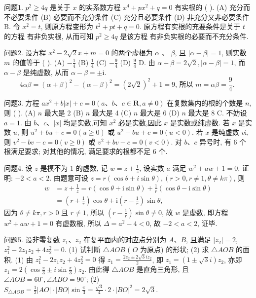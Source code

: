 
问题1. $p^2 \geqslant 4 q$ 是关于 $x$ 的实系数方程 $x^4+p x^2+q=0$ 有实根的 ( ).
(A) 充分而不必要条件
(B) 必要而不充分条件
(C) 充分且必要条件
(D) 非充分又非必要条件
B.
令 $x^2=t$, 则原方程变形为 $t^2+p t+q=0$.
原方程有实根的充要条件是关于 $t$ 的方程 有非负实根, 从而可知 $p^2 \geqslant 4 q$ 是该方程 有非负实根的必要而不充分条件.



问题2. 设方程 $x^2-2 \sqrt{2} x+m=0$ 的两个虚根为 $\alpha$ 、 $\beta$, 且 $|\alpha-\beta|=1$, 则实数 $m$ 的值等于 ( ).
(A) $-\frac{1}{4}$
(B) $\frac{1}{4}$
(C) $-\frac{9}{4}$
(D) $\frac{9}{4}$
D.
由 $\alpha+\beta=2 \sqrt{2},|\alpha-\beta|=1$, 而 $\alpha-\beta$ 是纯虚数, 从而 $\alpha-\beta= \pm \mathrm{i}$.
$$
4 \alpha \beta=(\alpha+\beta)^2-(\alpha-\beta)^2=(2 \sqrt{2})^2+1=9 \text {, 所以 } m=\alpha \beta=\frac{9}{4} \text {. }
$$



问题3. 方程 $a x^2+b|x|+c=0(a 、 b 、 c \in \mathbf{R}, a \neq 0)$ 在复数集内的根的个数是 $n$, 则 ( ).
(A) $n$ 最大是 2
(B) $n$ 最大是 4
(C) $n$ 最大是 6
(D) $n$ 最大是 8
C.
不妨设 $a=1$.
由 $b 、 c 、|x|$ 均是实数,可知 $x^2$ 必是实数,因此 $x$ 是实数或纯虚数.
若 $x$ 是实数 $u$, 则 $u^2+b u+c=0(u \geqslant 0)$ 或 $u^2-b u+c=0(u<0)$.
若 $x$ 是纯虚数 $v \mathrm{i}$, 则 $v^2-b v-c=0(v \geqslant 0)$ 或 $v^2+b v-c=0(v<0)$.
对 $b 、 c$ 异号时, 有 6 个根满足要求; 对其他的情况, 满足要求的根都不足 6 个.



问题4. 设 $z$ 是模不为 1 的虚数, 记 $w=z+\frac{1}{z}$, 设实数 $a$ 满足 $w^2+a w+1=0$, 证明: $-2<a<2$.
由题意可设 $z=r(\cos \theta+i \sin \theta),(r>0, r \neq 1, \theta \neq k \pi)$, 则
$$
\begin{aligned}
w & =z+\frac{1}{z}=r(\cos \theta+\mathrm{i} \sin \theta)+\frac{1}{r}(\cos \theta-\mathrm{i} \sin \theta) \\
& =\left(r+\frac{1}{r}\right) \cos \theta+\mathrm{i}\left(r-\frac{1}{r}\right) \sin \theta,
\end{aligned}
$$
因为 $\theta \neq k \pi, r>0$ 且 $r \neq 1$, 所以 $\left(r-\frac{1}{r}\right) \sin \theta \neq 0$, 故 $w$ 是虚数, 即方程 $w^2+a w+1=0$ 有虚数根, 所以 $\Delta=a^2-4<0$, 故 $-2<a<2$, 证毕.



问题5. 设非零复数 $z_1 、 z_2$ 在复平面内的对应点分别为 $A 、 B$, 且满足 $\left|z_2\right|=2$, $z_1^2-2 z_1 z_2+4 z_2^2=0$.
(1) 试判断 $\triangle A O B$ ( $O$ 为原点) 的形状;
(2) 求 $\triangle A O B$ 的面积.
(1) 由 $z_1^2-2 z_1 z_2+4 z_2^2=0$ 得 $z_1=\frac{2 z_2 \pm 2 \sqrt{3} i z_2}{2}$, 即 $z_1=(1 \pm \sqrt{3} i) z_2$, 亦即 $z_1=2\left(\cos \frac{\pi}{3} \pm i \sin \frac{\pi}{3}\right) z_2$.
由此得 $\triangle A O B$ 是直角三角形, 且 $\angle A O B=60^{\circ}, \angle A B O=90^{\circ}$;
(2) $S_{\triangle A O B}=\frac{1}{2}|A O| \cdot|B O| \sin \frac{\pi}{3}=\frac{\sqrt{3}}{4} \cdot 2 \cdot|B O|^2=2 \sqrt{3}$.



